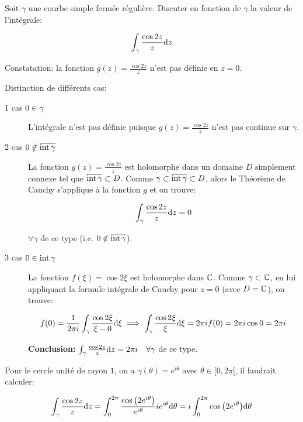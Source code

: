 \begin{example}[1]
    Soit $\gamma$ une courbe simple fermée régulière.
    Discuter en fonction de $\gamma$ la valeur de l'intégrale:
    
    \[\int_\gamma \frac{\cos 2z}{z} \mathrm{d}z\]
    
    Constatation: la fonction $g(z) = \frac{\cos 2z}{z}$ n'est pas définie en $z = 0$.
    
    Distinction de différents cas:
    
    \begin{description}
    \item[1\ier{} cas $0 \in \gamma$]
    L'intégrale n'est pas définie puisque $g(z) = \frac{\cos 2z}{z}$ n'est pas continue sur $\gamma$.
    
    \item[2\ieme{} cas $0 \notin \overline{\textrm{int}\, \gamma}$]
    La fonction $g(z) = \frac{\cos 2z}{z}$ est holomorphe dans un domaine $D$ simplement connexe tel que $\overline{\textrm{int}\, \gamma} \subset D$.
    Comme $\gamma \subset \overline{\textrm{int}\, \gamma} \subset D$, alors le Théorème de Cauchy s'applique à la fonction $g$ et on trouve:
    
    \[\int_\gamma \frac{\cos 2z}{z} \mathrm{d}z = 0\]
    
    $\forall \gamma$ de ce type (i.e. $0 \notin \overline{\textrm{int}\, \gamma}$).
    
    \item[3\ieme{} cas $0 \in \textrm{int}\,{\gamma}$]
    La fonction $f(\xi) = \cos 2\xi$ est holomorphe dans $\mathbb{C}$.
    Comme $\gamma \subset \mathbb{C}$, en lui appliquant la formule intégrale de Cauchy pour $z = 0$ (avec $D = \mathbb{C}$), on trouve:
    
    \[
    f(0) = \frac{1}{2 \pi i} \int_\gamma \frac{\cos 2\xi}{\xi - 0} \mathrm{d}\xi
    \implies \int_\gamma \frac{\cos 2\xi}{\xi} \mathrm{d}\xi = 2\pi i f(0) = 2\pi i \cos 0 = 2\pi i
    \]
    
    \textbf{Conclusion:} $\int_\gamma \frac{\cos 2z}{z} \mathrm{d}z = 2\pi i \quad \forall \gamma$ de ce type.
    \end{description}
\end{example}

\begin{remark}
    Pour le cercle unité de rayon $1$, on a $\gamma(\theta) = e^{i\theta}$ avec $\theta \in [0,2\pi[$, il faudrait calculer:
    
    \[
    \int_\gamma \frac{\cos 2z}{z} \mathrm{d}z
    = \int_0^{2\pi} \frac{\cos \big(2e^{i\theta}\big)}{e^{i\theta}} i e^{i\theta} \mathrm{d}\theta
    = i \int_0^{2\pi} \cos \big(2e^{i\theta}\big) \mathrm{d}\theta
    \]
\end{remark}

